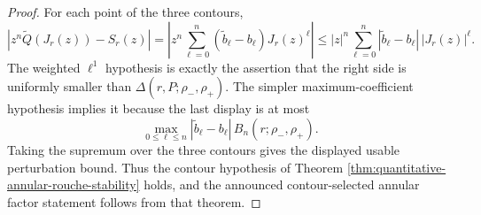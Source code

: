 \begin{proof}
For each point of the three contours,
\[
\left|z^n\widetilde Q(J_r(z))-S_r(z)\right|
=
\left|z^n\sum_{\ell=0}^{n}(\widetilde b_\ell-b_\ell)J_r(z)^\ell\right|
\le
|z|^n\sum_{\ell=0}^{n}|\widetilde b_\ell-b_\ell|\,|J_r(z)|^\ell.
\]
The weighted \(\ell^1\) hypothesis is exactly the assertion that the right side is uniformly smaller than \(\Delta(r,P;\rho_-,\rho_+)\).  The simpler maximum-coefficient hypothesis implies it because the last display is at most
\[
\max_{0\le \ell\le n}|\widetilde b_\ell-b_\ell|\,
B_n(r;\rho_-,\rho_+).
\]
Taking the supremum over the three contours gives the displayed usable
perturbation bound.  Thus the contour hypothesis of Theorem
\ref{thm:quantitative-annular-rouche-stability} holds, and the announced
contour-selected annular factor statement follows from that theorem.
\end{proof}

